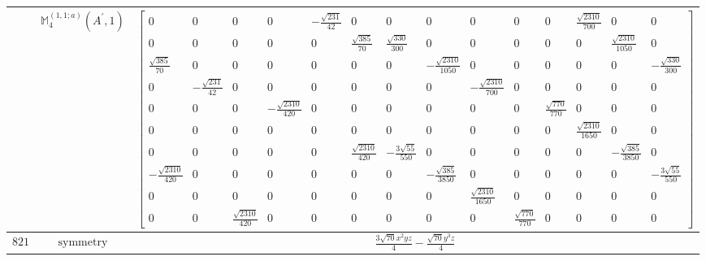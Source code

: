 \documentclass[fleqn,8pt,landscape]{jsarticle}
\begin{document}
\begin{longtable}{ccc}
$  $ & $ \mathbb{M}_{4}^{(1,1;a)}(A^{\prime},1) $ & $ \begin{bmatrix} 0 & 0 & 0 & 0 & - \frac{\sqrt{231}}{42} & 0 & 0 & 0 & 0 & 0 & 0 & \frac{\sqrt{2310}}{700} & 0 & 0 \\ 0 & 0 & 0 & 0 & 0 & \frac{\sqrt{385}}{70} & \frac{\sqrt{330}}{300} & 0 & 0 & 0 & 0 & 0 & \frac{\sqrt{2310}}{1050} & 0 \\ \frac{\sqrt{385}}{70} & 0 & 0 & 0 & 0 & 0 & 0 & - \frac{\sqrt{2310}}{1050} & 0 & 0 & 0 & 0 & 0 & - \frac{\sqrt{330}}{300} \\ 0 & - \frac{\sqrt{231}}{42} & 0 & 0 & 0 & 0 & 0 & 0 & - \frac{\sqrt{2310}}{700} & 0 & 0 & 0 & 0 & 0 \\ 0 & 0 & 0 & - \frac{\sqrt{2310}}{420} & 0 & 0 & 0 & 0 & 0 & 0 & \frac{\sqrt{770}}{770} & 0 & 0 & 0 \\ 0 & 0 & 0 & 0 & 0 & 0 & 0 & 0 & 0 & 0 & 0 & \frac{\sqrt{2310}}{1650} & 0 & 0 \\ 0 & 0 & 0 & 0 & 0 & \frac{\sqrt{2310}}{420} & - \frac{3 \sqrt{55}}{550} & 0 & 0 & 0 & 0 & 0 & - \frac{\sqrt{385}}{3850} & 0 \\ - \frac{\sqrt{2310}}{420} & 0 & 0 & 0 & 0 & 0 & 0 & - \frac{\sqrt{385}}{3850} & 0 & 0 & 0 & 0 & 0 & - \frac{3 \sqrt{55}}{550} \\ 0 & 0 & 0 & 0 & 0 & 0 & 0 & 0 & \frac{\sqrt{2310}}{1650} & 0 & 0 & 0 & 0 & 0 \\ 0 & 0 & \frac{\sqrt{2310}}{420} & 0 & 0 & 0 & 0 & 0 & 0 & \frac{\sqrt{770}}{770} & 0 & 0 & 0 & 0 \end{bmatrix} $ \\ \hline
$ 821 $ & $ \text{symmetry} $ & $ \frac{3 \sqrt{70} x^{2} y z}{4} - \frac{\sqrt{70} y^{3} z}{4} $ \\

\end{longtable}
\end{document}
